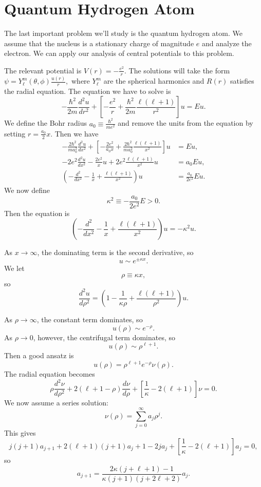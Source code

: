 \section{Quantum Hydrogen Atom}
The last important problem we'll study is the quantum hydrogen atom. We assume that the nucleus is a stationary charge of magnitude $e$ and analyze the electron. We can apply our analysis of central potentials to this problem.

The relevant potential is $V(r) = -\frac{e^2}{r}$. The solutions will take the form $\psi = Y_\ell^m (\theta, \phi) \frac{u(r)}{r},$ where $Y_\ell^m$ are the spherical harmonics and $R(r)$ satisfies the radial equation. The equation we have to solve is 
\begin{equation}
-\frac{\hbar^2}{2m} \frac{d^2 u}{dr^2} + \left[-\frac{e^2}{r} + \frac{\hbar^2}{2m} \frac{\ell(\ell+1)}{r^2} \right] u = Eu.
\end{equation}
We define the Bohr radius $a_0 \equiv \frac{\hbar^2}{me^2}$ and remove the units from the equation by setting $r = \frac{a_0}{2} x$. Then we have
\begin{align*}
    -\frac{2\hbar^2}{ma_0^2} \frac{d^2 u}{dx^2} + \left[-\frac{2e^2}{a_0 x} + \frac{2\hbar^2}{ma_0^2} \frac{\ell(\ell+1)}{x^2} \right] u &= Eu,\\
     -2e^2 \frac{d^2 u}{dx^2} - \frac{2e^2}{x} u + {2e^2}\frac{\ell(\ell+1)}{x^2}u&= a_0 E u,\\
     \left(-\frac{d^2}{dx^2} - \frac{1}{x} + \frac{\ell(\ell+1)}{x^2} \right) u &= \frac{a_0}{2e^2} E u.
\end{align*}
We now define 
\begin{equation}\kappa^2 \equiv -\frac{a_0}{2e^2} E > 0. \label{kappa}\end{equation}
Then the equation is
\begin{equation}
     \left(-\frac{d^2}{dx^2} - \frac{1}{x} + \frac{\ell(\ell+1)}{x^2} \right) u = -\kappa^2 u.
\end{equation}

As $x\to \infty$, the dominating term is the second derivative, so 
\[u \sim e^{\pm \kappa x}. \] We let \[\rho \equiv \kappa x, \]
so 
\begin{equation}
     \frac{d^2 u}{d\rho^2}   = \left(1- \frac{1}{\kappa \rho} + \frac{\ell(\ell+1)}{\rho^2} \right) u.
\end{equation}

As $\rho \to \infty$, the constant term dominates, so
\[u(\rho) \sim e^{-\rho}. \] As $\rho \to 0$, however, the centrifugal term dominates, so 
\[u(\rho) \sim \rho^{\ell+1}. \] Then a good ansatz is
\[ u(\rho) = \rho^{\ell+1} e^{-\rho} \nu (\rho). \]
The radial equation becomes 
\[ \rho \frac{d^2 \nu}{d\rho^2} + 2(\ell+1-\rho) \frac{d\nu}{d\rho} + \left[\frac{1}{\kappa}-2(\ell+1)\right]\nu = 0. \] 
We now assume a series solution:
\[\nu(\rho) = \sum\limits_{j=0}^{\infty} a_j \rho^j. \]
This gives 
\[j(j+1)a_{j+1} + 2(\ell+1)(j+1) a_j+1 - 2j a_j + \left[\frac{1}{\kappa} - 2 (\ell+1) \right] a_j = 0, \] so
\[a_{j+1} =  \frac{2\kappa(j+\ell+1)-1}{\kappa (j+1)(j+2\ell +2)} a_j.\]

